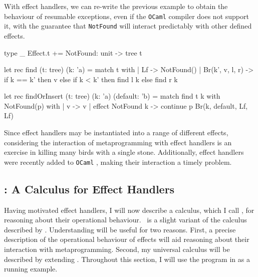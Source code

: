 With effect handlers, we can re-write the previous example to obtain the behaviour of resumable exceptions, even if the \texttt{OCaml} compiler does not support it, with the guarantee that \texttt{NotFound} will interact predictably with other defined effects.
\begin{ocaml}
type _ Effect.t += NotFound: unit -> tree t

let rec find (t: tree) (k: 'a) = match t with 
  | Lf -> NotFound()
  | Br(k', v, l, r) -> if k == k' then v 
                      else if k < k' then find l k
                            else find r k

let rec findOrInsert (t: tree) (k: 'a) (default: 'b) = 
  match find t k with NotFound(p) with 
  | v -> v
  | effect NotFound k -> continue p Br(k, default, Lf, Lf)
\end{ocaml}
Since effect handlers may be instantiated into a range of different effects, considering the interaction of metaprogramming with effect handlers is an exercise in killing many birds with a single stone. Additionally, effect handlers were recently added to \texttt{OCaml} \citep{sivaramakrishnan-21}, making their interaction a timely problem. 
\subsection{\efflang{}: A Calculus for Effect Handlers}\label{subsection:effect-handler-calculus}
\newcommand{\print}[1]{\texttt{\textbf{print}(#1)}}
\newcommand{\readInt}[1]{\texttt{\textbf{read\_int}(#1)}}


Having motivated effect handlers, I will now describe a calculus, which I call \efflang, for reasoning about their operational behaviour.\ \efflang{} is a slight variant of the calculus described by \citet{pretnar-15}. Understanding \efflang{} will be useful for two reasons. First, a precise description of the operational behaviour of effects will aid reasoning about their interaction with metaprogramming. Second, my universal calculus will be described by extending \efflang. Throughout this section, I will use the \efflang{} program in  as a running example. 

